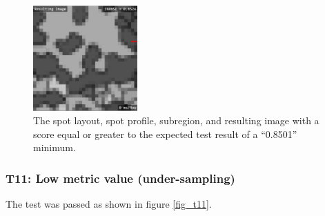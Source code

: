 \documentclass[12pt, titlepage]{article}
\begin{document}
\begin{figure}[h!]
\begin{center}
   \includegraphics[width=4cm]{t10f.png}
  \caption{The spot layout, spot profile, subregion, and resulting image with a score equal or greater to
  the expected test result of a ``0.8501'' minimum.}
  \label{fig_t10} 
  \end{center}
\end{figure}

\subsubsection{T11: Low metric value (under-sampling)}
The test was passed as shown in figure \ref{fig_t11}.
\end{document}
